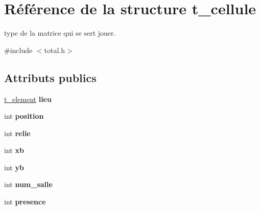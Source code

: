 \hypertarget{structt__cellule}{\section{Référence de la structure t\-\_\-cellule}
\label{structt__cellule}
}


type de la matrice qui se sert jouer.  




{\ttfamily \#include $<$total.\-h$>$}

\subsection*{Attributs publics}
\begin{DoxyCompactItemize}
\item 
\hypertarget{structt__cellule_acc90c92f8e818d09c854228459a0ab22}{\hyperlink{total_8h_a8b071baf43ce73c99f88fc8169b0514d}{t\-\_\-element} {\bfseries lieu}}\label{structt__cellule_acc90c92f8e818d09c854228459a0ab22}

\item 
\hypertarget{structt__cellule_a5e1ccabc00cb0d0408227098303c202f}{int {\bfseries position}}\label{structt__cellule_a5e1ccabc00cb0d0408227098303c202f}

\item 
\hypertarget{structt__cellule_af9dbc60de1329863b1bae065e31fe8bf}{int {\bfseries relie}}\label{structt__cellule_af9dbc60de1329863b1bae065e31fe8bf}

\item 
\hypertarget{structt__cellule_a5183498db3cf4a0f5850dafd8bbb7247}{int {\bfseries xb}}\label{structt__cellule_a5183498db3cf4a0f5850dafd8bbb7247}

\item 
\hypertarget{structt__cellule_a3f76a3701e3261c07cd0ab76556f3d77}{int {\bfseries yb}}\label{structt__cellule_a3f76a3701e3261c07cd0ab76556f3d77}

\item 
\hypertarget{structt__cellule_a2342d5f65d1caac334a6e32095992a64}{int {\bfseries num\-\_\-salle}}\label{structt__cellule_a2342d5f65d1caac334a6e32095992a64}

\item 
\hypertarget{structt__cellule_abfd3c5804afeb49a5d11c20e0d3c38b9}{int {\bfseries presence}}\label{structt__cellule_abfd3c5804afeb49a5d11c20e0d3c38b9}

\end{DoxyCompactItemize}


